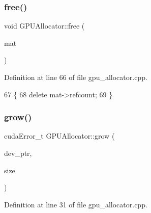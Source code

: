 \subsubsection{\texorpdfstring{free()}{free()}}
{\footnotesize\ttfamily void G\+P\+U\+Allocator\+::free (\begin{DoxyParamCaption}\item[{\mbox{\hyperlink{gpu__allocator_8h_aa7700da124206551c0f9d273152f13fb}{Gpu\+Mat}} $\ast$}]{mat }\end{DoxyParamCaption})}



Definition at line 66 of file gpu\+\_\+allocator.\+cpp.


\begin{DoxyCode}
67 \{
68     \textcolor{keyword}{delete} mat->refcount;
69 \}
\end{DoxyCode}
\mbox{\label{class_g_p_u_allocator_a04e2127f194094b27fe2351551c7ddeb}} 
\subsubsection{\texorpdfstring{grow()}{grow()}}
{\footnotesize\ttfamily cuda\+Error\+\_\+t G\+P\+U\+Allocator\+::grow (\begin{DoxyParamCaption}\item[{void $\ast$$\ast$}]{dev\+\_\+ptr,  }\item[{size\+\_\+t}]{size }\end{DoxyParamCaption})\hspace{0.3cm}{\ttfamily [private]}}



Definition at line 31 of file gpu\+\_\+allocator.\+cpp.


